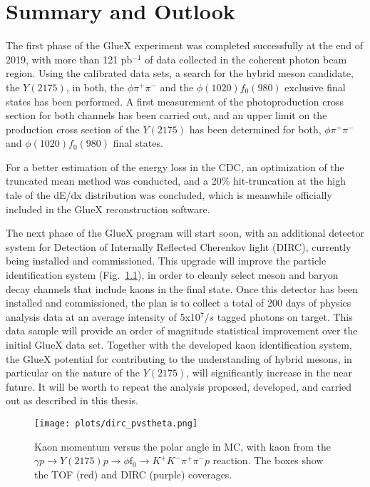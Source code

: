 \chapter{Summary and Outlook}
\label{chap.summ}

The first phase of the GlueX experiment was completed successfully at the end of 2019, with more than 121 pb$^{-1}$ of data collected in the coherent photon beam region. Using the calibrated data sets, a search for the hybrid meson candidate, the $Y(2175)$, in both, the $\phi\pi^{+}\pi^{-}$ and the $\phi(1020) f_0(980)$ exclusive final states has been performed. A first measurement of the photoproduction cross section for both channels has been carried out, and an upper limit on the production cross section of the $Y(2175)$ has been determined for both, $\phi\pi^{+}\pi^{-}$ and $\phi(1020)f_0(980)$ final states.
~\par For a better estimation of the energy loss in the CDC, an optimization of the truncated mean method was conducted, and a 20$\%$ hit-truncation at the high tale of the dE/dx distribution was concluded, which is meanwhile officially included in the GlueX reconstruction software.
~\par The next phase of the GlueX program will start soon, with an additional detector system for Detection of Internally Reflected Cherenkov light (DIRC), currently being installed and commissioned. This upgrade will improve the particle identification system (Fig.~\ref{fig.summ}), in order to cleanly select meson and baryon decay channels that include kaons in the final state. Once this detector has been installed and commissioned, the plan is to collect a total of 200 days of physics analysis data at an average intensity of 5x10$^{7}/s$ tagged photons on target. This data sample will provide an order of magnitude statistical improvement over the initial GlueX data set. Together with the developed kaon identification system, the GlueX potential for contributing to the understanding of hybrid mesons, in particular on the nature of the $Y(2175)$, will significantly increase in the near future. It will be worth to repeat the analysis proposed, developed, and carried out as described in this thesis.

\begin{figure}[htbp]
    \centering
    \texttt{[image: plots/dirc\_pvstheta.png]}
    \caption{Kaon momentum versus the polar angle in MC, with kaon from the $\gamma p \rightarrow Y(2175) p \rightarrow \phi \mathrm{f}_0  \rightarrow  K^{+} K^{-} \pi^{+} \pi^{-} p$ reaction. The boxes show the TOF (red) and DIRC (purple) coverages.}
    \label{fig.summ}
\end{figure}
